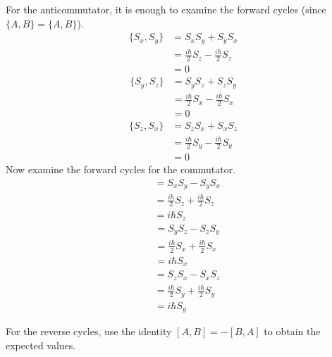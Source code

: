 For the anticommutator, it is enough to examine the forward cycles
(since $\{ A, B \} = \{ A, B \}$).
\begin{align*}
  \{S_x, S_y\} &= S_xS_y + S_yS_x \\
  &=
  \frac{i\hbar}{2}S_z - \frac{i\hbar}{2}S_z \\
  &=
  0
\end{align*}
\begin{align*}
  \{S_y, S_z\} &= S_yS_z + S_zS_y \\
  &=
  \frac{i\hbar}{2}S_x - \frac{i\hbar}{2}S_x \\
  &=
  0
\end{align*}
\begin{align*}
  \{S_z, S_x\} &= S_zS_x + S_xS_z \\
  &=
  \frac{i\hbar}{2}S_y - \frac{i\hbar}{2}S_y \\
  &=
  0
\end{align*}
Now examine the forward cycles for the commutator.
\begin{align*}
  [S_x, S_y] &= S_xS_y - S_yS_x \\
  &=
  \frac{i\hbar}{2}S_z + \frac{i\hbar}{2}S_z \\
  &= i\hbar S_z
\end{align*}
\begin{align*}
  [S_y, S_z] &= S_yS_z - S_zS_y \\
  &=
  \frac{i\hbar}{2}S_x + \frac{i\hbar}{2}S_x \\
  &=
  i\hbar S_x
\end{align*}
\begin{align*}
  [S_z, S_x] &= S_zS_x - S_xS_z \\
  &=
  \frac{i\hbar}{2}S_y + \frac{i\hbar}{2}S_y \\
  &=
  i\hbar S_y
\end{align*}

For the reverse cycles, use the identity $[A, B] = -[B, A]$ to obtain
the expected values.
